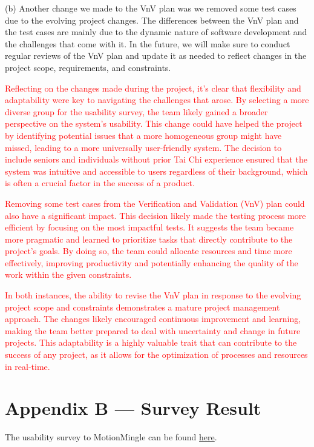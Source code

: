 \documentclass[12pt, titlepage]{article}
\newcommand{\rt}[1]{\textcolor{red}{#1}}
\begin{document}
(b) Another change we made to the VnV plan was we removed some test cases due to
the evolving project changes. The differences between the VnV plan and the test
cases are mainly due to the dynamic nature of software development and the
challenges that come with it. In the future, we will make sure to conduct
regular reviews of the VnV plan and update it as needed to reflect changes in
the project scope, requirements, and constraints.

\rt{Reflecting on the changes made during the project, it’s clear that flexibility 
and adaptability were key to navigating the challenges that arose. By selecting a 
more diverse group for the usability survey, the team likely gained a broader 
perspective on the system's usability. This change could have helped the project 
by identifying potential issues that a more homogeneous group might have missed, 
leading to a more universally user-friendly system. The decision to include seniors 
and individuals without prior Tai Chi experience ensured that the system was 
intuitive and accessible to users regardless of their background, which is often 
a crucial factor in the success of a product.}

\rt{Removing some test cases from the Verification and Validation (VnV) plan could 
also have a significant impact. This decision likely made the testing process more 
efficient by focusing on the most impactful tests. It suggests the team became more 
pragmatic and learned to prioritize tasks that directly contribute to the project's 
goals. By doing so, the team could allocate resources and time more effectively, 
improving productivity and potentially enhancing the quality of the work within the 
given constraints.}

\rt{In both instances, the ability to revise the VnV plan in response to the evolving 
project scope and constraints demonstrates a mature project management approach. 
The changes likely encouraged continuous improvement and learning, making the team 
better prepared to deal with uncertainty and change in future projects. This 
adaptability is a highly valuable trait that can contribute to the success of any 
project, as it allows for the optimization of processes and resources in real-time.}



\section*{Appendix B --- Survey Result}
The usability survey to MotionMingle can be found \href{https://docs.google.com/forms/d/e/1FAIpQLSchSdc_kHr98yHP8QPyWItHoP-dj_hJnuEtNByH0V2M_iDjWw/viewform}{here}.
\end{document}
